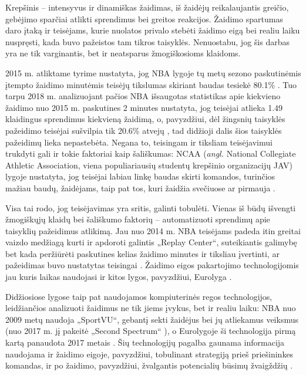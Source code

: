 \documentclass{VUMIFPSbakalaurinis}
\begin{document}
Krepšinis – intensyvus ir dinamiškas žaidimas, iš žaidėjų reikalaujantis greičio, gebėjimo sparčiai atlikti sprendimus bei greitos reakcijos. Žaidimo spartumas daro įtaką ir teisėjams, kurie nuolatos privalo stebėti žaidimo eigą bei realiu laiku nuspręsti, kada buvo pažeistos tam tikros taisyklės. Nenuostabu, jog šis darbas yra ne tik varginantis, bet ir neatsparus žmogiškosioms klaidoms. 

2015 m. atliktame tyrime nustatyta, jog NBA lygoje tų metų sezono paskutinėmis įtempto žaidimo minutėmis teisėjų tikslumas skiriant baudas tesiekė 80.1\% \cite{NBA_bias_Referee}. Tuo tarpu 2018 m. analizuojant pačios NBA išsaugotas statistikas apie kiekvieno žaidimo nuo 2015 m. paskutines 2 minutes nustatyta, jog teisėjai atlieka 1.49 klaidingus sprendimus kiekvieną žaidimą, o, pavyzdžiui, dėl žingsnių taisyklės pažeidimo teisėjai sušvilpia tik 20.6\% atvejų \cite{SiglerK}, tad didžioji dalis šios taisyklės pažeidimų lieka nepastebėta. Negana to, teisingam ir tiksliam teisėjavimui trukdyti gali ir tokie faktoriai kaip šališkumas: NCAA (\textit{angl.} National Collegiate Athletic Association, viena populiariausių studentų krepšinio organizacijų JAV) lygoje nustatyta, jog teisėjai labiau linkę baudas skirti komandos, turinčios mažiau baudų, žaidėjams, taip pat tos, kuri žaidžia svečiuose ar pirmauja \cite{OfficiatingBias}. 

Visa tai rodo, jog teisėjavimas yra sritis, galinti tobulėti. Vienas iš būdų išvengti žmogiškųjų klaidų bei šališkumo faktorių – automatizuoti sprendimų apie taisyklių pažeidimus atlikimą. Jau nuo 2014 m. NBA teisėjams padeda itin greitai vaizdo medžiagą kurti ir apdoroti galintis „Replay Center“, suteikiantis galimybę bet kada peržiūrėti paskutines kelias žaidimo minutes ir tiksliau įvertinti, ar pažeidimas buvo nustatytas teisingai \cite{NBAReplay}. Žaidimo eigos pakartojimo technologijomis jau kuris laikas naudojasi ir kitos lygos, pavyzdžiui, Eurolyga \cite{EuroleagueReplay}.

Didžiosiose lygose taip pat naudojamos kompiuterinės regos technologijos, leidžiančios analizuoti žaidimus ne tik jiems įvykus, bet ir realiu laiku: NBA nuo 2009 metų naudoja „SportVU“, gebantį sekti žaidėjus bei jų atliekamus veiksmus {\cite{NBAStatsVu}} (nuo 2017 m. jį pakeitė „Second Spectrum“ {\cite{SecondSpectrum})}, o Eurolygoje ši technologija pirmą kartą panaudota 2017 metais {\cite{EuroleagueStats}}. Šių technologijų pagalba gaunama informacija naudojama ir žaidimo eigoje, pavyzdžiui, tobulinant strategiją prieš priešininkes komandas, ir po žaidimo, pavyzdžiui, žvalgantis potencialių būsimų žvaigždžių {\cite{THOMAS20173}}.
\end{document}
